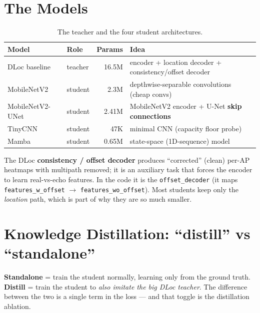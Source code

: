 \documentclass[11pt]{article}
\begin{document}
\section{The Models}

\begin{table}[h]
\centering
\footnotesize
\begin{tabular}{@{}llrl@{}}
\toprule
\textbf{Model} & \textbf{Role} & \textbf{Params} & \textbf{Idea} \\
\midrule
DLoc baseline       & teacher  & 16.5M & encoder + location decoder + consistency/offset decoder \\
MobileNetV2         & student  & 2.3M  & depthwise-separable convolutions (cheap convs) \\
MobileNetV2-UNet    & student  & 2.41M & MobileNetV2 encoder + U-Net \textbf{skip connections} \\
TinyCNN             & student  & 47K   & minimal CNN (capacity floor probe) \\
Mamba               & student  & 0.65M & state-space (1D-sequence) model \\
\bottomrule
\end{tabular}
\caption{The teacher and the four student architectures.}
\end{table}

\noindent The DLoc \textbf{consistency / offset decoder} produces ``corrected'' (clean) per-AP
heatmaps with multipath removed; it is an auxiliary task that forces the encoder to learn real-vs-echo
features. In the code it is the \texttt{offset\_decoder} (it maps \texttt{features\_w\_offset}
$\to$ \texttt{features\_wo\_offset}). Most students keep only the \emph{location} path, which is part
of why they are so much smaller.

\section{Knowledge Distillation: ``distill'' vs ``standalone''}

\textbf{Standalone} = train the student normally, learning only from the ground truth.
\textbf{Distill} = train the student to \emph{also imitate the big DLoc teacher}. The difference
between the two is a single term in the loss --- and that toggle is the distillation ablation.
\end{document}
